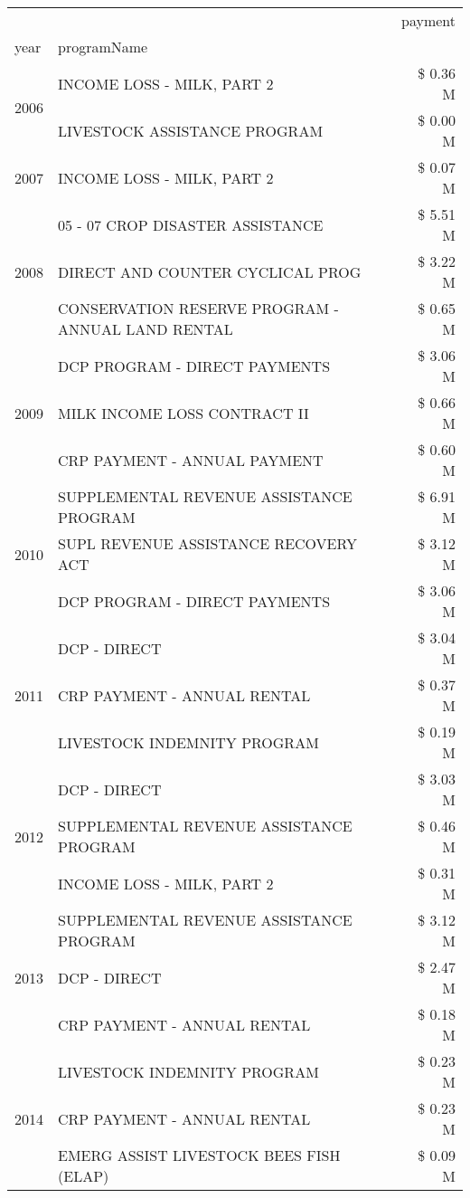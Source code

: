 \begin{tabular}{llr}
\toprule
 &  & payment \\
year & programName &  \\
\midrule
\multirow[t]{2}{*}{2006} & INCOME LOSS - MILK, PART 2 & \$ 0.36 M \\
 & LIVESTOCK ASSISTANCE PROGRAM & \$ 0.00 M \\
\cline{1-3}
2007 & INCOME LOSS - MILK, PART 2 & \$ 0.07 M \\
\cline{1-3}
\multirow[t]{3}{*}{2008} & 05 - 07 CROP DISASTER ASSISTANCE & \$ 5.51 M \\
 & DIRECT AND COUNTER CYCLICAL PROG & \$ 3.22 M \\
 & CONSERVATION RESERVE PROGRAM - ANNUAL LAND RENTAL & \$ 0.65 M \\
\cline{1-3}
\multirow[t]{3}{*}{2009} & DCP PROGRAM - DIRECT PAYMENTS & \$ 3.06 M \\
 & MILK INCOME LOSS CONTRACT II & \$ 0.66 M \\
 & CRP PAYMENT - ANNUAL PAYMENT & \$ 0.60 M \\
\cline{1-3}
\multirow[t]{3}{*}{2010} & SUPPLEMENTAL REVENUE ASSISTANCE PROGRAM & \$ 6.91 M \\
 & SUPL REVENUE ASSISTANCE RECOVERY ACT & \$ 3.12 M \\
 & DCP PROGRAM - DIRECT PAYMENTS & \$ 3.06 M \\
\cline{1-3}
\multirow[t]{3}{*}{2011} & DCP - DIRECT & \$ 3.04 M \\
 & CRP PAYMENT - ANNUAL RENTAL & \$ 0.37 M \\
 & LIVESTOCK INDEMNITY PROGRAM & \$ 0.19 M \\
\cline{1-3}
\multirow[t]{3}{*}{2012} & DCP - DIRECT & \$ 3.03 M \\
 & SUPPLEMENTAL REVENUE ASSISTANCE PROGRAM & \$ 0.46 M \\
 & INCOME LOSS - MILK, PART 2 & \$ 0.31 M \\
\cline{1-3}
\multirow[t]{3}{*}{2013} & SUPPLEMENTAL REVENUE ASSISTANCE PROGRAM & \$ 3.12 M \\
 & DCP - DIRECT & \$ 2.47 M \\
 & CRP PAYMENT - ANNUAL RENTAL & \$ 0.18 M \\
\cline{1-3}
\multirow[t]{3}{*}{2014} & LIVESTOCK INDEMNITY PROGRAM & \$ 0.23 M \\
 & CRP PAYMENT - ANNUAL RENTAL & \$ 0.23 M \\
 & EMERG ASSIST LIVESTOCK BEES FISH (ELAP) & \$ 0.09 M \\

\end{tabular}
